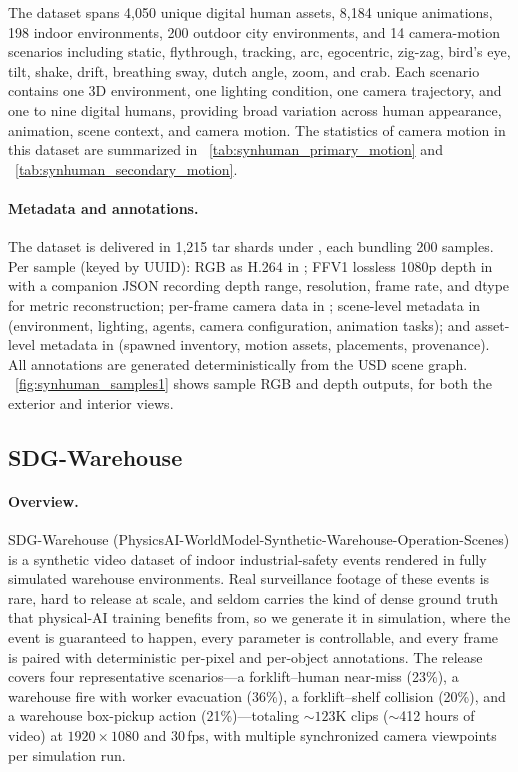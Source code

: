 The dataset spans 4{,}050 unique digital human assets, 8{,}184 unique animations, 198 indoor environments, 200 outdoor city environments, and 14 camera-motion scenarios including static, flythrough, tracking, arc, egocentric, zig-zag, bird's eye, tilt, shake, drift, breathing sway, dutch angle, zoom, and crab. Each scenario contains one 3D environment, one lighting condition, one camera trajectory, and one to nine digital humans, providing broad variation across human appearance, animation, scene context, and camera motion. The statistics of camera motion in this dataset are summarized in ~\cref{tab:synhuman_primary_motion} and ~\cref{tab:synhuman_secondary_motion}.




\paragraph{Metadata and annotations.}
\label{appendix:sdg_synhuman_metadata_annotations}
The dataset is delivered in 1{,}215 tar shards under , each bundling 200 samples. Per sample (keyed by UUID): RGB as H.264 in ; FFV1 lossless 1080p depth in  with a companion JSON recording depth range, resolution, frame rate, and dtype for metric reconstruction; per-frame camera data in ; scene-level metadata in  (environment, lighting, agents, camera configuration, animation tasks); and asset-level metadata in  (spawned inventory, motion assets, placements, provenance). All annotations are generated deterministically from the USD scene graph. ~\cref{fig:synhuman_samples1} shows sample RGB and depth outputs, for both the exterior and interior views.



\subsection{SDG-Warehouse}
\label{appendix:sdg_warehouse}

\paragraph{Overview.}
SDG-Warehouse (PhysicsAI-WorldModel-Synthetic-Warehouse-Operation-Scenes) is a synthetic video dataset of indoor industrial-safety events rendered in fully simulated warehouse environments. Real surveillance footage of these events is rare, hard to release at scale, and seldom carries the kind of dense ground truth that physical-AI training benefits from, so we generate it in simulation, where the event is guaranteed to happen, every parameter is controllable, and every frame is paired with deterministic per-pixel and per-object annotations. The release covers four representative scenarios---a forklift--human near-miss (23\%), a warehouse fire with worker evacuation (36\%), a forklift--shelf collision (20\%), and a warehouse box-pickup action (21\%)---totaling ${\sim}123$K clips ($\sim$412 hours of video) at $1920{\times}1080$ and $30$\,fps, with multiple synchronized camera viewpoints per simulation run.

